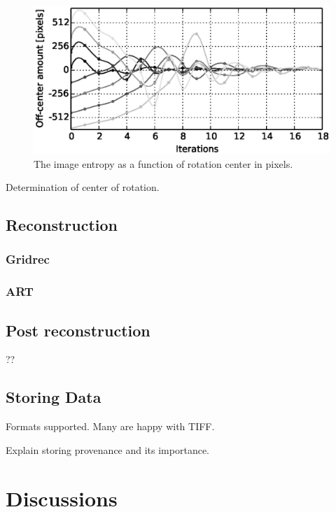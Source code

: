 \documentclass[pdf]{iucr}              %
\begin{document}
\begin{figure}
\centering
\includegraphics[width=\textwidth]{fig_center3.eps}
\caption{The image entropy as a function of rotation center in pixels.}
\label{fig:OptimizeCenter3}
\end{figure}

Determination of center of rotation.

\subsection{Reconstruction}

\subsubsection{Gridrec}

\subsubsection{ART} 

\subsection{Post reconstruction}

??

\subsection{Storing Data}

Formats supported. Many are happy with TIFF. 

Explain storing provenance and its importance.

\section{Discussions}
\end{document}
